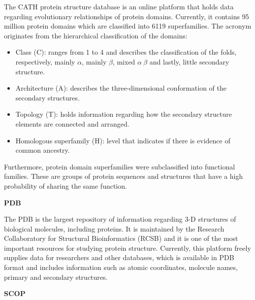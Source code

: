 The \gls{CATH} \cite{sillitoe2014cath} protein structure database is an online platform that holds data regarding evolutionary relationships of protein domains. Currently, it contains 95 million protein domains which are classified into 6119 superfamilies. The acronym originates from the hierarchical classification of the domains: 
\begin{itemize}
 	\item Class (C): ranges from 1 to 4 and describes the classification of the folds, respectively, mainly $\alpha$, mainly $\beta$, mixed $\alpha \ \beta$ and lastly, little secondary structure.
 	\item Architecture (A): describes the three-dimensional conformation of the secondary structures.
 	\item Topology (T): holds information regarding how the secondary structure elements are connected and arranged.
 	\item Homologous superfamily (H): level that indicates if there is evidence of common ancestry.
\end{itemize}

Furthermore, protein domain superfamilies were subclassified into functional families. These are groups of protein sequences and structures that have a high probability of sharing the same function.

\medskip
\textbf{PDB}

The \gls{PDB} \cite{berman2000protein} is the largest repository of information regarding 3-D structures of biological molecules, including proteins. It is maintained by the Research Collaboratory for Structural Bioinformatics (RCSB) and it is one of the most important resources for studying protein structure. Currently, this platform freely supplies data for researchers and other databases, which is available in \gls{PDB} format and includes information such as atomic coordinates, molecule names, primary and secondary structures. 

\medskip
\textbf{SCOP}

